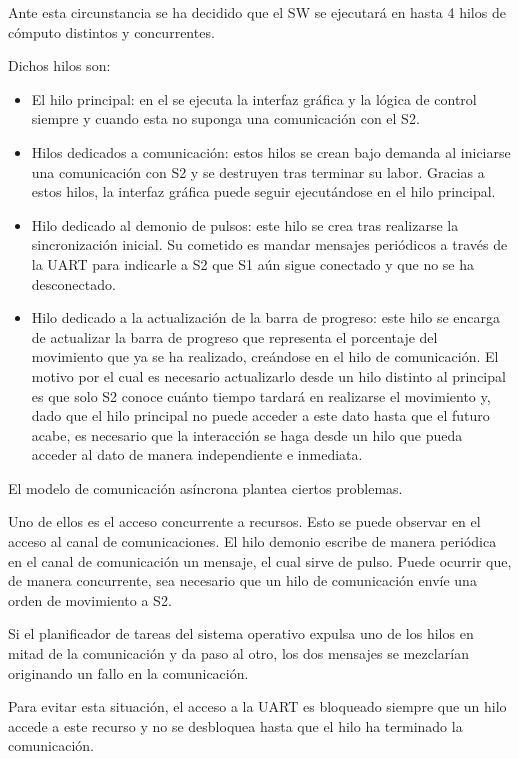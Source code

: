 Ante esta circunstancia se ha decidido que el \ac{SW} se ejecutará en hasta 4 hilos de cómputo distintos y concurrentes.

Dichos hilos son:

\begin{itemize}
    \item El hilo principal: en el se ejecuta la interfaz gráfica y la lógica de control siempre y cuando esta no suponga una comunicación con el \ac{S2}.
    \item Hilos dedicados a comunicación: estos hilos se crean bajo demanda al iniciarse una comunicación con \ac{S2} y se destruyen tras terminar su labor. Gracias a estos hilos, la interfaz gráfica puede seguir ejecutándose en el hilo principal.
    \item Hilo dedicado al demonio de pulsos: este hilo se crea tras realizarse la sincronización inicial. Su cometido es mandar mensajes periódicos a través de la UART para indicarle a \ac{S2} que \ac{S1} aún sigue conectado y que no se ha desconectado.
    \item Hilo dedicado a la actualización de la barra de progreso: este hilo se encarga de actualizar la barra de progreso que representa el porcentaje del movimiento que ya se ha realizado, creándose en el hilo de comunicación. El motivo por el cual es necesario actualizarlo desde un hilo distinto al principal es que solo \ac{S2} conoce cuánto tiempo tardará en realizarse el movimiento y, dado que el hilo principal no puede acceder a este dato hasta que el futuro acabe, es necesario que la interacción se haga desde un hilo que pueda acceder al dato de manera independiente e inmediata.
\end{itemize}

El modelo de comunicación asíncrona plantea ciertos problemas.

Uno de ellos es el acceso concurrente a recursos. Esto se puede observar en el acceso al canal de comunicaciones. El hilo demonio escribe de manera periódica en el canal de comunicación un mensaje, el cual sirve de pulso. Puede ocurrir que, de manera concurrente, sea necesario que un hilo de comunicación envíe una orden de movimiento a \ac{S2}.

Si el planificador de tareas del sistema operativo expulsa uno de los hilos en mitad de la comunicación y da paso al otro, los dos mensajes se mezclarían originando un fallo en la comunicación. 

Para evitar esta situación, el acceso a la UART es bloqueado siempre que un hilo accede a este recurso y no se desbloquea hasta que el hilo ha terminado la comunicación.

